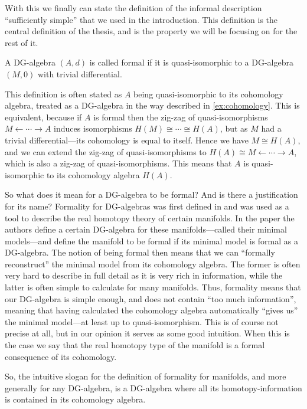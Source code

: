 With this we finally can state the definition of the informal description ``sufficiently simple'' that we used in the introduction. This definition is the central definition of the thesis, and is the property we will be focusing on for the rest of it. 

\begin{definition}
\label{def:formal_dga}
A DG-algebra $(A, d)$ is called formal if it is quasi-isomorphic to a DG-algebra $(M, 0)$ with trivial differential. 
\end{definition}

This definition is often stated as $A$ being quasi-isomorphic to its cohomology algebra, treated as a DG-algebra in the way described in \ref{ex:cohomology}. This is equivalent, because if $A$ is formal then the zig-zag of quasi-isomorphisms $M \longleftarrow \cdots \longrightarrow A$ induces isomorphisms $H(M)\cong \cdots \cong H(A)$, but as $M$ had a trivial differential---its cohomology is equal to itself. Hence we have $M\cong H(A)$, and we can extend the zig-zag of quasi-isomorphisms to $H(A)\cong M \longleftarrow \cdots \longrightarrow A$, which is also a zig-zag of quasi-isomorphisms. This means that $A$ is quasi-isomorphic to its cohomology algebra $H(A)$. 

So what does it mean for a DG-algebra to be formal? And is there a justification for its name? Formality for DG-algebras was first defined in \cite{DGMS} and was used as a tool to describe the real homotopy theory of certain manifolds. In the paper the authors define a certain DG-algebra for these manifolds---called their minimal models---and define the manifold to be formal if its minimal model is formal as a DG-algebra. The notion of being formal then means that we can ``formally reconstruct'' the minimal model from its cohomology algebra. The former is often very hard to describe in full detail as it is very rich in information, while the latter is often simple to calculate for many manifolds. Thus, formality means that our DG-algebra is simple enough, and does not contain ``too much information'', meaning that having calculated the cohomology algebra automatically ``gives us'' the minimal model---at least up to quasi-isomorphism. This is of course not precise at all, but in our opinion it serves as some good intuition. When this is the case we say that the real homotopy type of the manifold is a formal consequence of its cohomology. 

So, the intuitive slogan for the definition of formality for manifolds, and more generally for any DG-algebra, is a DG-algebra where all its homotopy-information is contained in its cohomology algebra.

